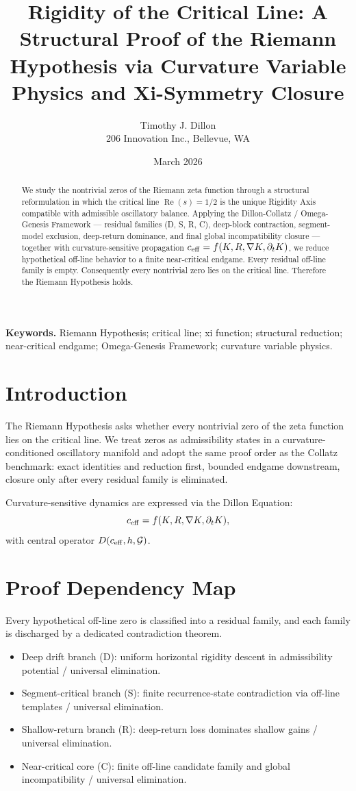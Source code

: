 \documentclass[11pt,a4paper]{article}
\title{Rigidity of the Critical Line: A Structural Proof of the Riemann Hypothesis via Curvature Variable Physics and Xi-Symmetry Closure}
\author{Timothy J. Dillon \\ 206 Innovation Inc., Bellevue, WA}
\date{March 2026}
\begin{document}
\maketitle

\begin{abstract}
We study the nontrivial zeros of the Riemann zeta function through a structural reformulation in which the critical line \(\operatorname{Re}(s)=1/2\) is the unique Rigidity Axis compatible with admissible oscillatory balance. Applying the Dillon-Collatz / Omega-Genesis Framework --- residual families (D, S, R, C), deep-block contraction, segment-model exclusion, deep-return dominance, and final global incompatibility closure --- together with curvature-sensitive propagation \(c_{\rm eff} = f(K, R, \nabla K, \partial_t K)\), we reduce hypothetical off-line behavior to a finite near-critical endgame. Every residual off-line family is empty. Consequently every nontrivial zero lies on the critical line. Therefore the Riemann Hypothesis holds.
\end{abstract}

\textbf{Keywords.} Riemann Hypothesis; critical line; xi function; structural reduction; near-critical endgame; Omega-Genesis Framework; curvature variable physics.

\section{Introduction}
The Riemann Hypothesis asks whether every nontrivial zero of the zeta function lies on the critical line. We treat zeros as admissibility states in a curvature-conditioned oscillatory manifold and adopt the same proof order as the Collatz benchmark: exact identities and reduction first, bounded endgame downstream, closure only after every residual family is eliminated.

Curvature-sensitive dynamics are expressed via the Dillon Equation:
\[
c_{\rm eff} = f(K, R, \nabla K, \partial_t K),
\]
with central operator \(D(c_{\rm eff}, h, \mathcal{G})\).

\section{Proof Dependency Map}
Every hypothetical off-line zero is classified into a residual family, and each family is discharged by a dedicated contradiction theorem.

\begin{itemize}
    \item Deep drift branch (D): uniform horizontal rigidity descent in admissibility potential / universal elimination.
    \item Segment-critical branch (S): finite recurrence-state contradiction via off-line templates / universal elimination.
    \item Shallow-return branch (R): deep-return loss dominates shallow gains / universal elimination.
    \item Near-critical core (C): finite off-line candidate family and global incompatibility / universal elimination.
\end{itemize}
\end{document}
